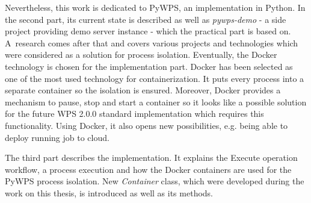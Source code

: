Nevertheless, this work is dedicated to PyWPS, an implementation in
Python. In the second part, its current state is described as well as
\textit{pywps-demo} - a side project providing demo server instance -
which the practical part is based on. A~research comes after that and
covers various projects and technologies which were considered as a
solution for process isolation. Eventually, the Docker technology is
chosen for the implementation part.  Docker has been selected as one
of the most used technology for containerization. It puts every
process into a separate container so the isolation is
ensured. Moreover, Docker provides a mechanism to pause, stop and
start a container so it looks like a possible solution for the future
WPS 2.0.0 standard implementation which requires this
functionality. Using Docker, it also opens new possibilities,
e.g. being able to deploy running job to cloud.

The third part describes the implementation. It explains the Execute
operation workflow, a process execution and how the Docker containers
are used for the PyWPS process isolation. New \textit{Container}
class, which were developed during the work on this thesis, is
introduced as well as its methods.
